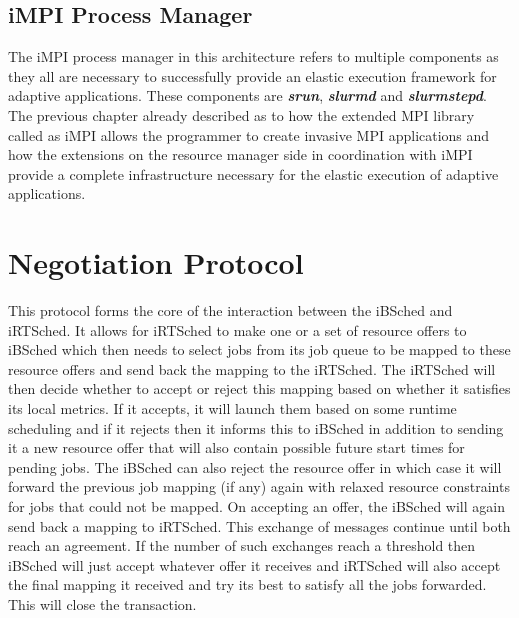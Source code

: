 \subsection{iMPI Process Manager}
The iMPI process manager in this architecture refers to multiple components as they all are necessary to successfully provide an elastic execution framework for adaptive applications. These components are \textbf{\textit{srun}}, \textbf{\textit{slurmd}} and \textbf{\textit{slurmstepd}}. The previous chapter already described as to how the extended MPI library called as iMPI allows the programmer to create invasive MPI applications and how the extensions on the resource manager side in coordination with iMPI provide a complete infrastructure necessary for the elastic execution of adaptive applications.
\section{Negotiation Protocol}
This protocol forms the core of the interaction between the iBSched and iRTSched. It allows for iRTSched to make one or a set of resource offers to iBSched which then needs to select jobs from its job queue to be mapped to these resource offers and send back the mapping to the iRTSched. The iRTSched will then decide whether to accept or reject this mapping based on whether it satisfies its local metrics. If it accepts, it will launch them based on some runtime scheduling and if it rejects then it informs this to iBSched in addition to sending it a new resource offer
that will also contain possible future start times for pending jobs. The iBSched can also reject the resource offer in which case it will forward the previous job mapping (if any) again with relaxed resource constraints for jobs that could not be mapped. On accepting an offer, the iBSched will again send back a mapping to iRTSched. This exchange of messages continue until both reach an agreement. If the number of such exchanges reach a threshold then iBSched will just accept whatever offer it receives and iRTSched will also accept the final mapping it received and try its best to satisfy all the jobs forwarded. This will close the transaction.

